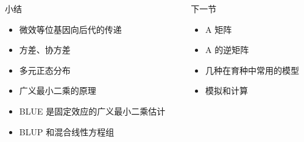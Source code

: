 \documentclass[serif,aspectratio=169]{beamer}
\begin{document}
\begin{frame}
  \begin{columns}
    \begin{column}{.5\textwidth}
      \begin{block}{小结}
        \begin{itemize}
        \item 微效等位基因向后代的传递
        \item 方差、协方差
        \item 多元正态分布
        \item 广义最小二乘的原理
        \item BLUE 是固定效应的广义最小二乘估计
        \item BLUP 和混合线性方程组
        \end{itemize}
      \end{block}
    \end{column}

    \pause
    \begin{column}{.5\textwidth}
      \begin{block}{下一节}
        \begin{itemize}
        \item A 矩阵
        \item A 的逆矩阵
        \item 几种在育种中常用的模型
        \item 模拟和计算
        \end{itemize}
      \end{block}
    \end{column}
  \end{columns}
\end{frame}
\end{document}
